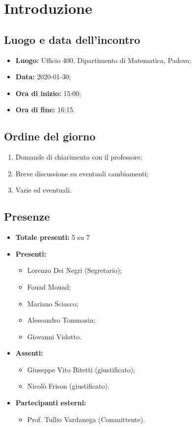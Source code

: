 \section*{Introduzione}

\subsection*{Luogo e data dell'incontro}
	\begin{itemize}
		\item \textbf{Luogo:} Ufficio 400, Dipartimento di Matematica, Padova;
		\item \textbf{Data:} 2020-01-30;
		\item \textbf{Ora di inizio:} 15:00;
		\item \textbf{Ora di fine:} 16:15.
	\end{itemize}

\subsection*{Ordine del giorno}
	\begin{enumerate}
			\item Domande di chiarimento con il professore;
  			\item Breve discussione su eventuali cambiamenti;
  			\item Varie ed eventuali.
	\end{enumerate}

\subsection*{Presenze}
	\begin{itemize}
		\item \textbf{Totale presenti:} 5 su 7
		\item \textbf{Presenti: }
			\begin{itemize}			
				\item Lorenzo Dei Negri (Segretario);
				\item Fouad Mouad;
				\item Mariano Sciacco;
				\item Alessandro Tommasin;
				\item Giovanni Vidotto.
			\end{itemize}
		\item \textbf{Assenti: } 
			\begin{itemize}	
				\item Giuseppe Vito Bitetti (giustificato);
				\item Nicolò Frison (giustificato).
			\end{itemize}
		\item \textbf{Partecipanti esterni:}
			\begin{itemize}
				\item Prof. Tullio Vardanega (Committente).
			\end{itemize}
	\end{itemize}


